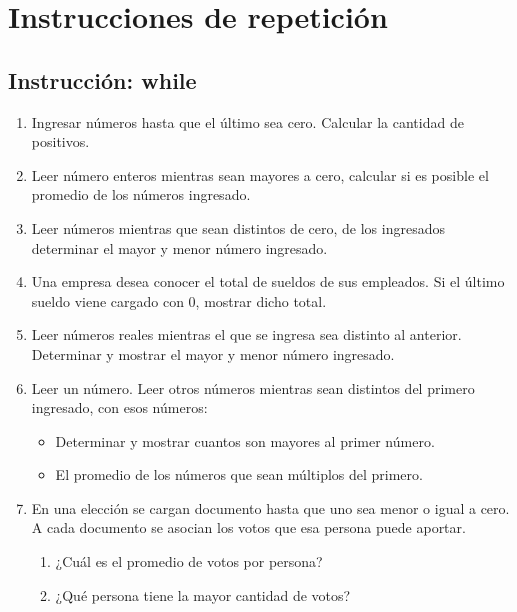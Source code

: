  \chapter{Instrucciones de repetición}


 \section{Instrucción: while}

 \begin{enumerate}[resume]

   \item Ingresar números hasta que el último sea cero. Calcular la cantidad de positivos.

   \item Leer número enteros mientras sean mayores a cero, calcular si es posible el promedio de los números ingresado.
 
   \item Leer números mientras que sean distintos de cero, de los ingresados determinar el mayor y menor número ingresado.

   \item Una empresa desea conocer el total de sueldos de sus empleados. Si el último sueldo viene cargado con 0, mostrar dicho total.
   
   \item Leer números reales mientras el que se ingresa sea distinto al anterior. Determinar y mostrar el mayor y menor número ingresado.

   \item  Leer un número. Leer otros números mientras sean distintos del primero ingresado, con esos números:
   \begin{itemize}
      \item Determinar y mostrar cuantos son mayores al primer número.
	  \item El promedio de los números que sean múltiplos del primero.
   \end{itemize}	
	
	\item En una elección se cargan documento hasta que uno sea menor o igual a cero. A cada documento se asocian los votos que esa persona puede aportar.
	\begin{enumerate}
		\item ¿Cuál es el promedio de votos por persona?
		\item ¿Qué persona tiene la mayor cantidad de votos?	
	\end{enumerate}
		

\end{enumerate}
